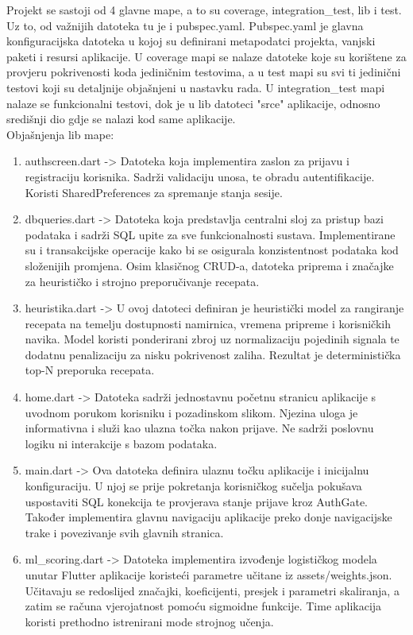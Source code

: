 \documentclass[diplomskirad]{fer}
\begin{document}
Projekt se sastoji od 4 glavne mape, a to su coverage, integration\_test, lib i test. Uz to, od važnijih datoteka tu je i pubspec.yaml. Pubspec.yaml je glavna konfiguracijska datoteka u kojoj su definirani metapodatci projekta, vanjski paketi i resursi aplikacije. U coverage mapi se nalaze datoteke koje su korištene za provjeru pokrivenosti koda jediničnim testovima, a u test mapi su svi ti jedinični testovi koji su detaljnije objašnjeni u nastavku rada. U integration\_test mapi nalaze se funkcionalni testovi, dok je u lib datoteci "srce" aplikacije, odnosno središnji dio gdje se nalazi kod same aplikacije.
\\
Objašnjenja lib mape:
\begin{enumerate}
    \item authscreen.dart -> Datoteka koja implementira zaslon za prijavu i registraciju korisnika. Sadrži validaciju unosa, te obradu autentifikacije. Koristi SharedPreferences za spremanje stanja sesije.
    \item dbqueries.dart -> Datoteka koja predstavlja centralni sloj za pristup bazi podataka i sadrži SQL upite za sve funkcionalnosti sustava. Implementirane su i transakcijske operacije kako bi se osigurala konzistentnost podataka kod složenijih promjena. Osim klasičnog CRUD-a, datoteka priprema i značajke za heurističko i strojno preporučivanje recepata.
    \item heuristika.dart -> U ovoj datoteci definiran je heuristički model za rangiranje recepata na temelju dostupnosti namirnica, vremena pripreme i korisničkih navika. Model koristi ponderirani zbroj uz normalizaciju pojedinih signala te dodatnu penalizaciju za nisku pokrivenost zaliha. Rezultat je deterministička top-N preporuka recepata.
    \item home.dart -> Datoteka sadrži jednostavnu početnu stranicu aplikacije s uvodnom porukom korisniku i pozadinskom slikom. Njezina uloga je informativna i služi kao ulazna točka nakon prijave. Ne sadrži poslovnu logiku ni interakcije s bazom podataka.
    \item main.dart  -> Ova datoteka definira ulaznu točku aplikacije i inicijalnu konfiguraciju. U njoj se prije pokretanja korisničkog sučelja pokušava uspostaviti SQL konekcija te provjerava stanje prijave kroz AuthGate. Također implementira glavnu navigaciju aplikacije preko donje navigacijske trake i povezivanje svih glavnih stranica.
    \item ml\_scoring.dart -> Datoteka implementira izvođenje logističkog modela unutar Flutter aplikacije koristeći parametre učitane iz assets/weights.json. Učitavaju se redoslijed značajki, koeficijenti, presjek i parametri skaliranja, a zatim se računa vjerojatnost pomoću sigmoidne funkcije. Time aplikacija koristi prethodno istrenirani mode strojnog učenja.

\end{enumerate}
\end{document}
